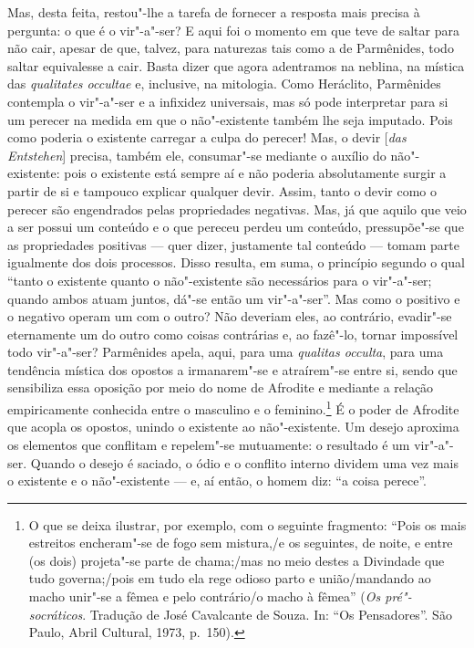 Mas, desta feita, restou"-lhe a tarefa de fornecer a resposta mais precisa à
pergunta: o que é o vir"-a"-ser? E aqui foi o momento em que teve de saltar
para não cair, apesar de que, talvez, para naturezas tais como a de
Parmênides, todo saltar equivalesse a cair. Basta dizer que agora adentramos
na neblina, na mística das \textit{qualitates occultae} e, inclusive, na mitologia. 
Como Heráclito, Parmênides contempla o vir"-a"-ser e a infixidez universais, 
mas só pode interpretar para si um perecer na medida em que o não"-existente também lhe seja
 imputado. Pois como poderia o existente carregar a culpa do perecer! Mas, o
 devir [\textit{das Entstehen}] precisa, também ele, consumar"-se mediante o
 auxílio do não"-existente: pois o existente está sempre aí e não poderia
 absolutamente surgir a partir de si e tampouco explicar qualquer devir.
 Assim, tanto o devir como o perecer são engendrados pelas propriedades
 negativas. Mas, já que aquilo que veio a ser possui um conteúdo e o que
 pereceu perdeu um conteúdo, pressupõe"-se que as propriedades positivas ---
 quer dizer, justamente tal conteúdo --- tomam parte igualmente dos dois
 processos. Disso resulta, em suma, o princípio segundo o qual ``tanto o
 existente quanto o não"-existente são necessários para o vir"-a"-ser; quando
 ambos atuam juntos, dá"-se então um vir"-a"-ser''. Mas como o positivo e o
 negativo operam um com o outro? Não deveriam eles, ao contrário, evadir"-se
 eternamente um do outro como coisas contrárias e, ao fazê"-lo, tornar
 impossível todo vir"-a"-ser? Parmênides apela, aqui, para uma \textit{qualitas 
 occulta}, para uma tendência mística dos opostos a irmanarem"-se e atraírem"-se 
 entre si, sendo que sensibiliza essa oposição por meio do nome
 de Afrodite e mediante a relação empiricamente conhecida entre o masculino e
 o feminino.\footnote{ O que se deixa ilustrar, por exemplo, com o seguinte
 fragmento: ``Pois os mais estreitos encheram"-se de fogo sem mistura,/e os
 seguintes, de noite, e entre (os dois) projeta"-se parte de chama;/mas no
 meio destes a Divindade que tudo governa;/pois em tudo ela rege odioso parto
 e união/mandando ao macho unir"-se a fêmea e pelo contrário/o macho à
 fêmea'' (\textit{Os pré"-socráticos}. Tradução de José Cavalcante de Souza.
 In: ``Os Pensadores''. São Paulo, Abril Cultural, 1973, p.~150).} É o poder
 de Afrodite que acopla os opostos, unindo o existente ao não"-existente. Um
 desejo aproxima os elementos que conflitam e repelem"-se mutuamente: o
 resultado é um vir"-a"-ser. Quando o desejo é saciado, o ódio e o conflito
 interno dividem uma vez mais o existente e o não"-existente --- e, aí então,
 o homem diz: ``a coisa perece''.

